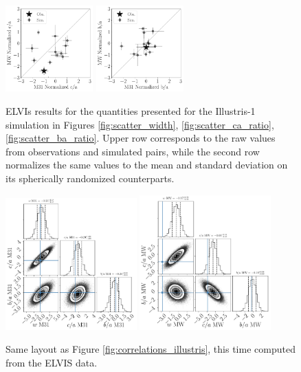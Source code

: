 \documentclass[a4paper,fleqn,usenatbib]{mnras}
\begin{document}
\begin{figure}
\includegraphics[width=0.30\textwidth]{scatter_norm_ranked_elvis_ca_ratio.pdf}
\includegraphics[width=0.30\textwidth]{scatter_norm_ranked_elvis_ba_ratio.pdf}
\caption{ELVIs results for the quantities presented for the Illustris-1
  simulation in Figures  \ref{fig:scatter_width},
  \ref{fig:scatter_ca_ratio}, \ref{fig:scatter_ba_ratio}.
Upper row corresponds to the raw values from observations and
simulated pairs, while the second row normalizes the same values to
the mean and standard deviation on its spherically randomized
counterparts. 
\label{fig:scatter_elvis}}
\end{figure}

\begin{figure}
\centering
\includegraphics[width=0.45\textwidth]{gaussian_model_elvis_M31.pdf}
\includegraphics[width=0.45\textwidth]{gaussian_model_elvis_MW.pdf}
\caption{
Same layout as Figure \ref{fig:correlations_illustris}, this time
computed from the ELVIS data.
\label{fig:correlations_elvis}}
\end{figure}
\end{document}
